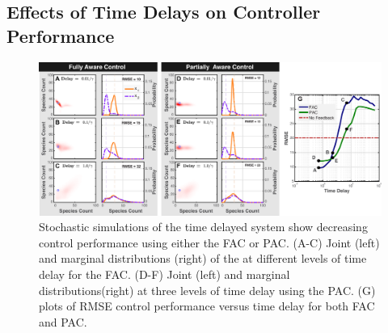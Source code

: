 \documentclass[12pt]{article}
\begin{document}

\subsection{Effects of Time Delays on Controller Performance}
\begin{figure}
\begin{center}
\includegraphics[width=1\textwidth]{TimeDelay.pdf}
\vspace{-0.1in}
\caption{Stochastic simulations of the time delayed system show decreasing control performance using either the FAC or PAC. (A-C) Joint (left) and marginal distributions (right) of the at different levels of time delay for the FAC. (D-F) Joint (left) and marginal distributions(right) at three levels of time delay using the PAC.  (G) plots of RMSE control performance versus time delay for both FAC and PAC.}
\label{Time}
\end{center}
\vspace{-0.2in}
\end{figure}
\end{document}
